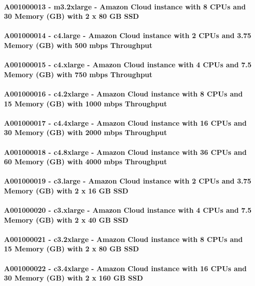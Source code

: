 \paragraph{A001000013 - m3.2xlarge - Amazon Cloud instance with 8 CPUs and 30 Memory (GB) with 2 x 80 GB SSD}
\paragraph{A001000014 - c4.large - Amazon Cloud instance with 2 CPUs and 3.75 Memory (GB) with 500 mbps Throughput}
\paragraph{A001000015 - c4.xlarge - Amazon Cloud instance with 4 CPUs and 7.5 Memory (GB) with 750 mbps Throughput}
\paragraph{A001000016 - c4.2xlarge - Amazon Cloud instance with 8 CPUs and 15 Memory (GB) with 1000 mbps Throughput}
\paragraph{A001000017 - c4.4xlarge - Amazon Cloud instance with 16 CPUs and 30 Memory (GB) with 2000 mbps Throughput}
\paragraph{A001000018 - c4.8xlarge - Amazon Cloud instance with 36 CPUs and 60 Memory (GB) with 4000 mbps Throughput}
\paragraph{A001000019 - c3.large - Amazon Cloud instance with 2 CPUs and 3.75 Memory (GB) with 2 x 16 GB SSD}
\paragraph{A001000020 - c3.xlarge - Amazon Cloud instance with 4 CPUs and 7.5 Memory (GB) with 2 x 40 GB SSD}
\paragraph{A001000021 - c3.2xlarge - Amazon Cloud instance with 8 CPUs and 15 Memory (GB) with 2 x 80 GB SSD}
\paragraph{A001000022 - c3.4xlarge - Amazon Cloud instance with 16 CPUs and 30 Memory (GB) with 2 x 160 GB SSD}
